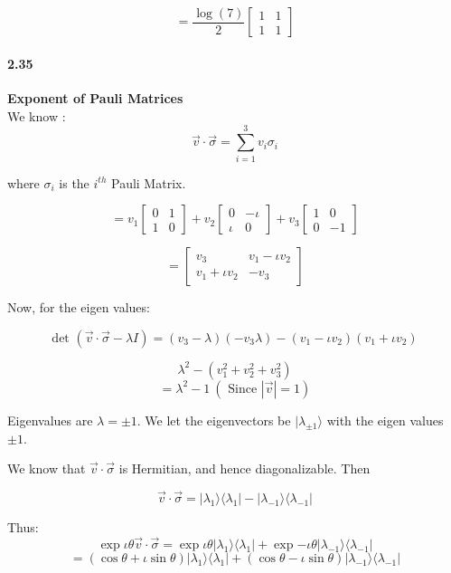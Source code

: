 $$ = \frac{\log(7)}{2} \begin{bmatrix}
    1 & 1 \\ 1 & 1
\end{bmatrix}$$

\paragraph{2.35} \textbf{Exponent of Pauli Matrices}%
\\

We know :
$$ \vec{v} \cdot \Vec{\sigma} = \sum_{i = 1}^3 v_i \sigma_i$$

where $\sigma_i$ is the $i^{th}$ Pauli Matrix.

$$ = v_1 \begin{bmatrix}
    0 & 1 \\ 1 & 0 
\end{bmatrix} +   v_2 \begin{bmatrix}
    0 & -\iota \\ \iota & 0 
\end{bmatrix}  + v_3 \begin{bmatrix}
    1 & 0 \\ 0 & -1 
\end{bmatrix}$$

$$ = \begin{bmatrix}
    v_3 & v_1 - \iota v_2 \\ v_1 + \iota v_2 & -v_3
\end{bmatrix}$$

Now, for the eigen values:

$$ \text{det }(\vec{v} \cdot \vec{\sigma} - \lambda I)  = (v_3 - \lambda) (-v_3 \lambda) - (v_1 - \iota v_2) (v_1 + \iota v_2)$$

$$ \lambda^2 - (v_1^2 + v_2^2 + v_3^2)$$
$$ = \lambda^2 - 1 \ ( \text{ Since }|\vec{v}| = 1)$$

Eigenvalues are $\lambda = \pm 1$. We let the eigenvectors be $|\lambda_{\pm 1} \rangle$ with the eigen values $\pm 1$.

We know that $\vec{v} \cdot \vec{\sigma}$  is Hermitian, and hence diagonalizable. Then

$$ \vec{v} \cdot \vec{\sigma}   = |\lambda_1\rangle \langle \lambda_1| - |\lambda_{-1}\rangle \langle \lambda_{-1}|$$

Thus:
$$ \exp{\iota \theta \vec{v} \cdot \vec{\sigma}} = \exp{\iota \theta} |\lambda_1\rangle \langle \lambda_1| + \exp{-\iota \theta} |\lambda_{-1} \rangle \langle \lambda_{-1}|$$
$$ = (\cos{\theta} + \iota \sin{\theta}) |\lambda_1\rangle \langle \lambda_1| + (\cos{\theta} - \iota \sin{\theta}) |\lambda_{-1} \rangle \langle \lambda_{-1}| $$

